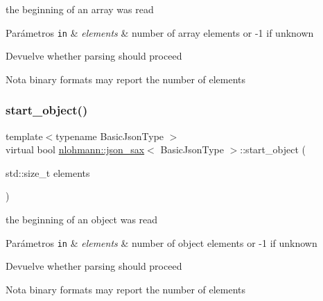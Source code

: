 the beginning of an array was read 


\begin{DoxyParams}[1]{Parámetros}
\mbox{\tt in}  & {\em elements} & number of array elements or -\/1 if unknown \\
\hline
\end{DoxyParams}
\begin{DoxyReturn}{Devuelve}
whether parsing should proceed 
\end{DoxyReturn}
\begin{DoxyNote}{Nota}
binary formats may report the number of elements 
\end{DoxyNote}
\mbox{\label{structnlohmann_1_1json__sax_a0671528b0debb5a348169d61f0382a0f}} 
\subsubsection{\texorpdfstring{start\+\_\+object()}{start\_object()}}
{\footnotesize\ttfamily template$<$typename Basic\+Json\+Type $>$ \\
virtual bool \mbox{\hyperlink{structnlohmann_1_1json__sax}{nlohmann\+::json\+\_\+sax}}$<$ Basic\+Json\+Type $>$\+::start\+\_\+object (\begin{DoxyParamCaption}\item[{std\+::size\+\_\+t}]{elements }\end{DoxyParamCaption})\hspace{0.3cm}{\ttfamily [pure virtual]}}



the beginning of an object was read 


\begin{DoxyParams}[1]{Parámetros}
\mbox{\tt in}  & {\em elements} & number of object elements or -\/1 if unknown \\
\hline
\end{DoxyParams}
\begin{DoxyReturn}{Devuelve}
whether parsing should proceed 
\end{DoxyReturn}
\begin{DoxyNote}{Nota}
binary formats may report the number of elements 
\end{DoxyNote}
\mbox{\label{structnlohmann_1_1json__sax_a07eab82f6c82d606787eee9ad73d2bda}} 
